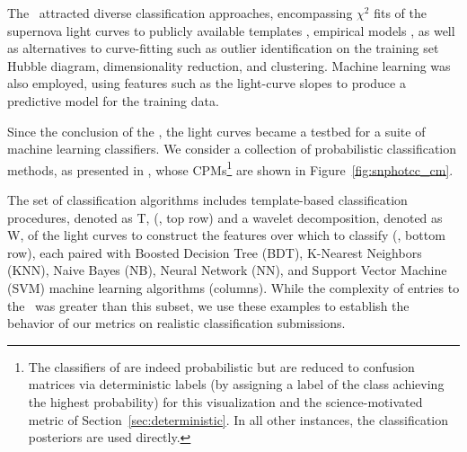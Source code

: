 The \snphotcc\ attracted diverse classification approaches, encompassing $\chi^{2}$ fits of the supernova light curves to publicly available templates \citep{nugent_kcorrections_2002}, empirical models \citep{conley_sifto:_2008}, as well as alternatives to curve-fitting such as outlier identification on the training set Hubble diagram, dimensionality reduction, and clustering.
Machine learning was also employed, using features such as the light-curve slopes to produce a predictive model for the training data.

Since the conclusion of the \snphotcc, the light curves became a testbed for a suite of machine learning classifiers.
We consider a collection of probabilistic classification methods, as presented in \citet{lochner_photometric_2016}, whose CPMs\footnote{The classifiers of \citet{lochner_photometric_2016} are indeed probabilistic but are reduced to confusion matrices via deterministic labels (by assigning a label of the class achieving the highest probability) for this visualization and the science-motivated metric of Section~\ref{sec:deterministic}.
In all other instances, the classification posteriors are used directly.} are shown in Figure~\ref{fig:snphotcc_cm}.

The set of classification algorithms includes template-based classification procedures, denoted as T, (\citet{sako_photometric_2011}, top row) and a wavelet decomposition, denoted as W, of the light curves to construct the features over which to classify (\citet{newling_statistical_2011}, bottom row), each paired with Boosted Decision Tree (BDT), K-Nearest Neighbors (KNN), Naive Bayes (NB), Neural Network (NN), and Support Vector Machine (SVM) machine learning algorithms (columns).
While the complexity of entries to the \snphotcc\ was greater than this subset, we use these examples to establish the behavior of our metrics on realistic classification submissions.

